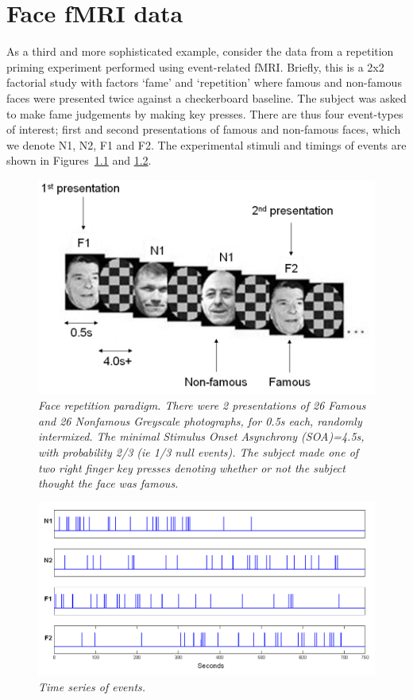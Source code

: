 
\chapter{Face fMRI data}

As a third and more sophisticated example, consider the data from a repetition priming experiment performed using event-related fMRI. Briefly, this is a 2x2 factorial study with factors `fame' and `repetition' where famous and non-famous faces were presented twice against a checkerboard baseline. The subject was asked to make fame judgements by making key presses. There are thus four event-types of interest; first and second presentations of famous and non-famous faces, which we denote N1, N2, F1 and F2. The experimental stimuli and timings of events are shown in Figures~\ref{face_stim} and \ref{face_timing}.

\begin{figure}
\begin{center}
\includegraphics[width=120mm]{faces/face_stim}
\caption{\em Face repetition paradigm.  There were 2 presentations of 26 Famous and 26 Nonfamous Greyscale photographs, for 0.5s each, randomly intermixed. The minimal Stimulus Onset Asynchrony (SOA)=4.5s, with probability 2/3 (ie 1/3 null events). The subject made one of two right finger key presses denoting whether or not the subject thought the face was famous. \label{face_stim}}
\end{center}
\end{figure}

\begin{figure}
\begin{center}
\includegraphics[width=120mm]{faces/face_timing}
\caption{\em Time series of events. \label{face_timing}}
\end{center}
\end{figure}

